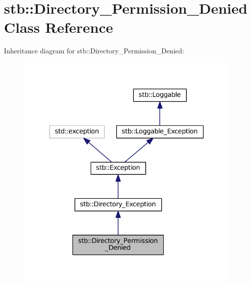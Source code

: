 \hypertarget{classstb_1_1Directory__Permission__Denied}{\section{stb\+:\+:Directory\+\_\+\+Permission\+\_\+\+Denied Class Reference}
\label{classstb_1_1Directory__Permission__Denied}
}


Inheritance diagram for stb\+:\+:Directory\+\_\+\+Permission\+\_\+\+Denied\+:
\nopagebreak
\begin{figure}[H]
\begin{center}
\leavevmode
\includegraphics[width=316pt]{classstb_1_1Directory__Permission__Denied__inherit__graph}
\end{center}
\end{figure}


